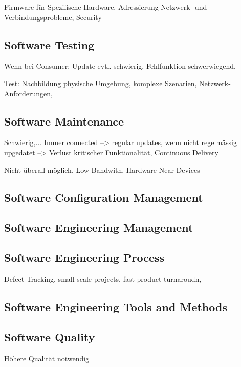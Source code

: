 Firmware für Spezifische Hardware, Adressierung Netzwerk- und Verbindungsprobleme, Security



\subsection{Software Testing}
Wenn bei Consumer: Update evtl. schwierig, Fehlfunktion schwerwiegend,

Test: Nachbildung physische Umgebung, komplexe Szenarien, Netzwerk-Anforderungen, 



\subsection{Software Maintenance}
Schwierig,...
Immer connected --> regular updates, wenn nicht regelmässig upgedatet --> Verlust kritischer Funktionalität, Continuous Delivery

Nicht überall möglich, Low-Bandwith, Hardware-Near Devices



\subsection{Software Configuration Management}



\subsection{Software Engineering Management}



\subsection{Software Engineering Process}
Defect Tracking, small scale projects, fast product turnaroudn, 



\subsection{Software Engineering Tools and Methods}



\subsection{Software Quality}
Höhere Qualität notwendig








